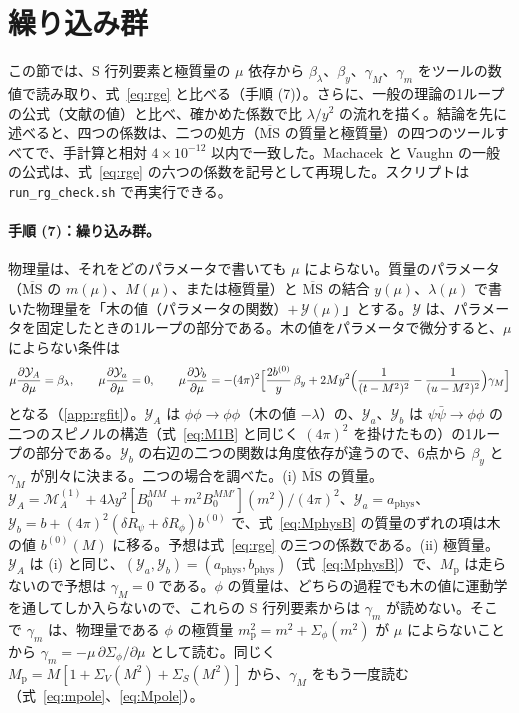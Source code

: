\documentclass[a4paper,10pt]{ltjsarticle}
\newcommand{\MSbar}{\overline{\mathrm{MS}}}
\begin{document}
\FloatBarrier
\section{繰り込み群}\label{sec:rg}

この節では、S 行列要素と極質量の $\mu$ 依存から $\beta_\lambda$、$\beta_y$、$\gamma_M$、$\gamma_m$ をツールの数値で読み取り、式~\eqref{eq:rge} と比べる（手順 (7)）。さらに、一般の理論の1ループの公式（文献の値）と比べ、確かめた係数で比 $\lambda/y^2$ の流れを描く。結論を先に述べると、四つの係数は、二つの処方（$\MSbar$ の質量と極質量）の四つのツールすべてで、手計算と相対 $4\times10^{-12}$ 以内で一致した。Machacek と Vaughn の一般の公式は、式~\eqref{eq:rge} の六つの係数を記号として再現した。スクリプトは \texttt{run\_rg\_check.sh} で再実行できる。

\paragraph{手順 (7)：繰り込み群。}物理量は、それをどのパラメータで書いても $\mu$ によらない。質量のパラメータ（$\MSbar$ の $m(\mu)$、$M(\mu)$、または極質量）と $\MSbar$ の結合 $y(\mu)$、$\lambda(\mu)$ で書いた物理量を「木の値（パラメータの関数）$+\,\mathcal Y(\mu)$」とする。$\mathcal Y$ は、パラメータを固定したときの1ループの部分である。木の値をパラメータで微分すると、$\mu$ によらない条件は
\begin{equation}
\mu\frac{\partial\mathcal Y_A}{\partial\mu}=\beta_\lambda,\qquad
\mu\frac{\partial\mathcal Y_a}{\partial\mu}=0,\qquad
\mu\frac{\partial\mathcal Y_b}{\partial\mu}=-(4\pi)^2\Bigl[\frac{2b^{(0)}}{y}\,\beta_y+2My^2\Bigl(\frac{1}{(t-M^2)^2}-\frac{1}{(u-M^2)^2}\Bigr)\gamma_M\Bigr]
\label{eq:rgfit}
\end{equation}
となる（\ref{app:rgfit}）。$\mathcal Y_A$ は $\phi\phi\to\phi\phi$（木の値 $-\lambda$）の、$\mathcal Y_a$、$\mathcal Y_b$ は $\psi\bar\psi\to\phi\phi$ の二つのスピノルの構造（式~\eqref{eq:M1B} と同じく $(4\pi)^2$ を掛けたもの）の1ループの部分である。$\mathcal Y_b$ の右辺の二つの関数は角度依存が違うので、6点から $\beta_y$ と $\gamma_M$ が別々に決まる。二つの場合を調べた。(i) $\MSbar$ の質量。$\mathcal Y_A=\mathcal M_A^{(1)}+4\lambda y^2[B_0^{MM}+m^2B_0^{MM\prime}](m^2)/(4\pi)^2$、$\mathcal Y_a=a_{\mathrm{phys}}$、$\mathcal Y_b=b+(4\pi)^2(\delta R_\psi+\delta R_\phi)b^{(0)}$ で、式~\eqref{eq:MphysB} の質量のずれの項は木の値 $b^{(0)}(M)$ に移る。予想は式~\eqref{eq:rge} の三つの係数である。(ii) 極質量。$\mathcal Y_A$ は (i) と同じ、$(\mathcal Y_a,\mathcal Y_b)=(a_{\mathrm{phys}},b_{\mathrm{phys}})$（式~\eqref{eq:MphysB}）で、$M_{\mathrm p}$ は走らないので予想は $\gamma_M=0$ である。$\phi$ の質量は、どちらの過程でも木の値に運動学を通してしか入らないので、これらの S 行列要素からは $\gamma_m$ が読めない。そこで $\gamma_m$ は、物理量である $\phi$ の極質量 $m_{\mathrm p}^2=m^2+\Sigma_\phi(m^2)$ が $\mu$ によらないことから $\gamma_m=-\mu\,\partial\Sigma_\phi/\partial\mu$ として読む。同じく $M_{\mathrm p}=M[1+\Sigma_V(M^2)+\Sigma_S(M^2)]$ から、$\gamma_M$ をもう一度読む（式~\eqref{eq:mpole}、\eqref{eq:Mpole}）。
\end{document}
